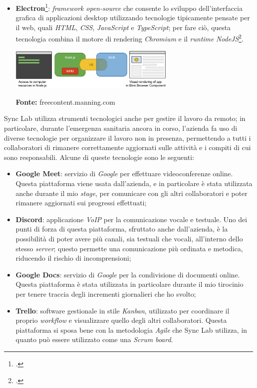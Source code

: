 \begin{itemize}
  \item \textbf{Electron}\footcite{tec:electron}: \textit{framework open-source} che consente lo sviluppo dell'interfaccia grafica di applicazioni desktop utilizzando tecnologie tipicamente pensate per il web, quali \textit{HTML}, \textit{CSS}, \textit{JavaScript} e \textit{TypeScript}; per fare ciò, questa tecnologia combina il motore di rendering \textit{Chromium} e il \textit{runtime} \textit{NodeJS}\footcite{tec:nodejs}.

  \begin{minipage}{\linewidth}
    \centering
      \includegraphics[height=2cm]{immagini/electron}
    \caption*{\textbf{Fonte:} freecontent.manning.com}
  \end{minipage}
\end{itemize}

Sync Lab utilizza strumenti tecnologici anche per gestire il lavoro da remoto; in particolare, durante l'emergenza sanitaria ancora in corso, l'azienda fa uso di diverse tecnologie per organizzare il lavoro non in presenza, permettendo a tutti i collaboratori di rimanere correttamente aggiornati sulle attività e i compiti di cui sono responsabili. Alcune di queste tecnologie sono le seguenti:

\begin{itemize}
  \item \textbf{Google Meet}: servizio di \textit{Google} per effettuare videoconferenze online. Questa piattaforma viene usata dall'azienda, e in particolare è stata utilizzata anche durante il mio \textit{stage}, per comunicare con gli altri collaboratori e poter rimanere aggiornati sui progressi effettuati;

  \item \textbf{Discord}: applicazione \textit{VoIP} per la comunicazione vocale e testuale. Uno dei punti di forza di questa piattaforma, sfruttato anche dall'azienda, è la possibilità di poter avere più canali, sia testuali che vocali, all'interno dello stesso \textit{server}; questo permette una comunicazione più ordinata e metodica, riducendo il rischio di incomprensioni;

  \item \textbf{Google Docs}: servizio di \textit{Google} per la condivisione di documenti online. Questa piattaforma è stata utilizzata in particolare durante il mio tirocinio per tenere traccia degli incrementi giornalieri che ho svolto;

  \item \textbf{Trello}: software gestionale in stile \textit{Kanban}, utilizzato per coordinare il proprio \textit{workflow} e visualizzare quello degli altri collaboratori. Questa piattaforma si sposa bene con la metodologia \textit{Agile} che Sync Lab utilizza, in quanto può essere utilizzato come una \textit{Scrum board}.
\end{itemize}

